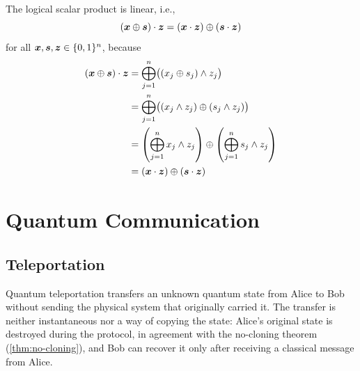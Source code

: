 The logical scalar product is linear, i.e.,
\begin{equation}\label{eq:logical-scalar-product-linear}
({\boldsymbol{x}}\oplus{\boldsymbol{s}})\cdot{\boldsymbol{z}}
=
({\boldsymbol{x}}\cdot{\boldsymbol{z}})\oplus({\boldsymbol{s}}\cdot{\boldsymbol{z}})
\end{equation}
for all \({\boldsymbol{x}},{\boldsymbol{s}},{\boldsymbol{z}}\in\{0,1\}^n\), because
\[
\begin{aligned}
({\boldsymbol{x}}\oplus{\boldsymbol{s}})\cdot{\boldsymbol{z}}
&=
\bigoplus_{j=1}^n \bigl((x_j\oplus s_j)\wedge z_j\bigr) \\
&=
\bigoplus_{j=1}^n \bigl((x_j\wedge z_j)\oplus(s_j\wedge z_j)\bigr) \\
&=
\left(\bigoplus_{j=1}^n x_j\wedge z_j\right)
\oplus
\left(\bigoplus_{j=1}^n s_j\wedge z_j\right) \\
&=
({\boldsymbol{x}}\cdot{\boldsymbol{z}})\oplus({\boldsymbol{s}}\cdot{\boldsymbol{z}})
\end{aligned}
\]


\clearpage


\section{Quantum Communication}\label{sec:quantum-communication}


\subsection{Teleportation}\label{sec:teleportation}

{Quantum teleportation} transfers an unknown quantum state from Alice to Bob without sending the physical system that originally carried it.
The transfer is neither instantaneous nor a way of copying the state: Alice's original state is destroyed during the protocol, in agreement with the no-cloning theorem (\autoref{thm:no-cloning}), and Bob can recover it only after receiving a classical message from Alice.

